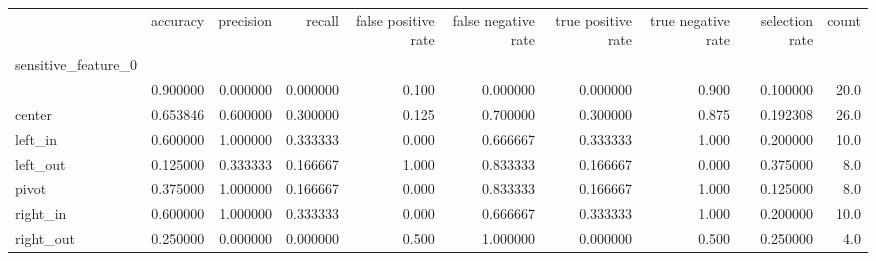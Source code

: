 \begin{tabular}{lrrrrrrrrr}
\toprule
{} &  accuracy &  precision &    recall &  false positive rate &  false negative rate &  true positive rate &  true negative rate &  selection rate &  count \\
sensitive\_feature\_0 &           &            &           &                      &                      &                     &                     &                 &        \\
\midrule
                    &  0.900000 &   0.000000 &  0.000000 &                0.100 &             0.000000 &            0.000000 &               0.900 &        0.100000 &   20.0 \\
center              &  0.653846 &   0.600000 &  0.300000 &                0.125 &             0.700000 &            0.300000 &               0.875 &        0.192308 &   26.0 \\
left\_in             &  0.600000 &   1.000000 &  0.333333 &                0.000 &             0.666667 &            0.333333 &               1.000 &        0.200000 &   10.0 \\
left\_out            &  0.125000 &   0.333333 &  0.166667 &                1.000 &             0.833333 &            0.166667 &               0.000 &        0.375000 &    8.0 \\
pivot               &  0.375000 &   1.000000 &  0.166667 &                0.000 &             0.833333 &            0.166667 &               1.000 &        0.125000 &    8.0 \\
right\_in            &  0.600000 &   1.000000 &  0.333333 &                0.000 &             0.666667 &            0.333333 &               1.000 &        0.200000 &   10.0 \\
right\_out           &  0.250000 &   0.000000 &  0.000000 &                0.500 &             1.000000 &            0.000000 &               0.500 &        0.250000 &    4.0 \\
\bottomrule
\end{tabular}
